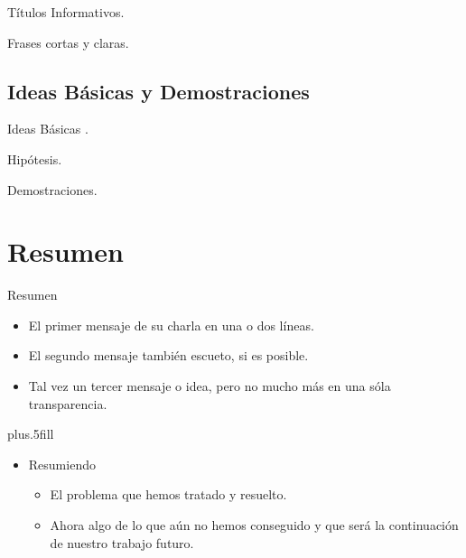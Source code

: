 \documentclass{beamer}
\begin{document}
\begin{frame}{Títulos Informativos.}
\end{frame}

\begin{frame}{Frases cortas y claras.}
\end{frame}


\subsection{Ideas Básicas y Demostraciones}


\begin{frame}{Ideas Básicas .}
\end{frame}

\begin{frame}{Hipótesis.}
\end{frame}

\begin{frame}{Demostraciones.}
\end{frame}

\section*{Resumen}

\begin{frame}{Resumen}

  \begin{itemize}
  \item
    El \alert{primer mensaje} de su  charla en una o dos líneas.
  \item
    El \alert{segundo mensaje} también escueto, si es posible.
  \item
    Tal vez un \alert{tercer mensaje o idea}, pero no mucho más en una sóla transparencia.
  \end{itemize}
  
  \vskip0pt plus.5fill
  \begin{itemize}
  \item
    Resumiendo
    \begin{itemize}
    \item
      El problema que hemos tratado y resuelto.
    \item
      Ahora algo de lo que aún no hemos conseguido y que será la continuación de nuestro trabajo futuro. 
    \end{itemize}
  \end{itemize}
\end{frame}
\end{document}
